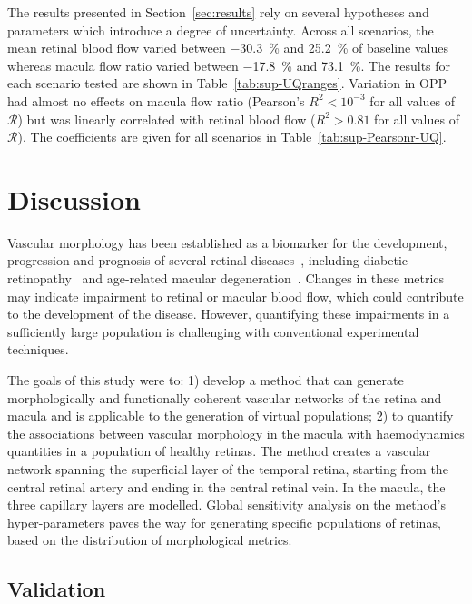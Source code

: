 \documentclass[11pt,]{article}
\begin{document}
The results presented in Section~\ref{sec:results} rely on several hypotheses and parameters which introduce a degree of uncertainty.
Across all scenarios, the mean retinal blood flow varied between \SI{-30.3}{\percent} and \SI{25.2}{\percent} of baseline values whereas macula flow ratio varied between \SI{-17.8}{\percent} and \SI{73.1}{\percent}.
The results for each scenario tested are shown in Table~\ref{tab:sup-UQranges}.
Variation in OPP had almost no effects on macula flow ratio (Pearson's $R^2<10^{-3}$ for all values of $\mathcal R$) but was linearly correlated with retinal blood flow ($R^2>0.81$ for all values of $\mathcal R$).
The coefficients are given for all scenarios in Table~\ref{tab:sup-Pearsonr-UQ}.


\section{Discussion}\label{sec:discussion}

Vascular morphology has been established as a biomarker for the development, progression and prognosis of several retinal diseases~\cite{Balaratnasingam_2023,Yao_2020}, including diabetic retinopathy~\cite{Garg2022,Hein_2023} and age-related macular degeneration~\cite{Told2023,Narnaware_2023}.
Changes in these metrics may indicate impairment to retinal or macular blood flow, which could contribute to the development of the disease. However, quantifying these impairments in a sufficiently large population is challenging with conventional experimental techniques.

The goals of this study were to: 1) develop a method that can generate morphologically and functionally coherent vascular networks of the retina and macula and is applicable to the generation of virtual populations; 2) to quantify the associations between vascular morphology in the macula with haemodynamics quantities in a population of healthy retinas. The method creates a vascular network spanning the superficial layer of the temporal retina, starting from the central retinal artery and ending in the central retinal vein. In the macula, the three capillary layers are modelled. Global sensitivity analysis on the method’s hyper-parameters paves the way for generating specific populations of retinas, based on the distribution of morphological metrics. 

\subsection{Validation}\label{sec:disc-validation}
\end{document}
